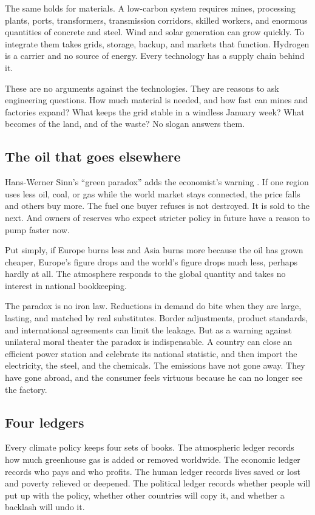 \documentclass[12pt,a4paper]{book}
\begin{document}
The same holds for materials. A low-carbon system requires mines, processing plants, ports, transformers, transmission corridors, skilled workers, and enormous quantities of concrete and steel. Wind and solar generation can grow quickly. To integrate them takes grids, storage, backup, and markets that function. Hydrogen is a carrier and no source of energy. Every technology has a supply chain behind it.

These are no arguments against the technologies. They are reasons to ask engineering questions. How much material is needed, and how fast can mines and factories expand? What keeps the grid stable in a windless January week? What becomes of the land, and of the waste? No slogan answers them.

\subsection{The oil that goes elsewhere}

Hans-Werner Sinn's ``green paradox'' adds the economist's warning \cite{Sinn2015}. If one region uses less oil, coal, or gas while the world market stays connected, the price falls and others buy more. The fuel one buyer refuses is not destroyed. It is sold to the next. And owners of reserves who expect stricter policy in future have a reason to pump faster now.

Put simply, if Europe burns less and Asia burns more because the oil has grown cheaper, Europe's figure drops and the world's figure drops much less, perhaps hardly at all. The atmosphere responds to the global quantity and takes no interest in national bookkeeping.

The paradox is no iron law. Reductions in demand do bite when they are large, lasting, and matched by real substitutes. Border adjustments, product standards, and international agreements can limit the leakage. But as a warning against unilateral moral theater the paradox is indispensable. A country can close an efficient power station and celebrate its national statistic, and then import the electricity, the steel, and the chemicals. The emissions have not gone away. They have gone abroad, and the consumer feels virtuous because he can no longer see the factory.

\subsection{Four ledgers}

Every climate policy keeps four sets of books. The atmospheric ledger records how much greenhouse gas is added or removed worldwide. The economic ledger records who pays and who profits. The human ledger records lives saved or lost and poverty relieved or deepened. The political ledger records whether people will put up with the policy, whether other countries will copy it, and whether a backlash will undo it.
\end{document}
